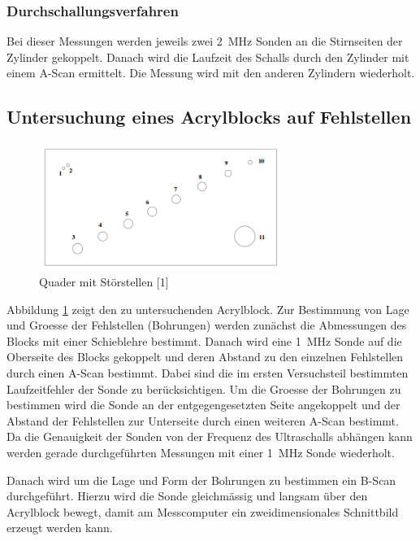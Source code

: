 \documentclass[11pt,ngerman,a4paper]{article}
\begin{document}
\subsubsection{Durchschallungsverfahren}
Bei dieser Messungen werden jeweils zwei \SI{2}{\mega\hertz} Sonden an die Stirnseiten der Zylinder gekoppelt. Danach wird die Laufzeit des Schalls durch den Zylinder mit einem A-Scan ermittelt. Die Messung wird mit den anderen Zylindern wiederholt.
\subsection{Untersuchung eines Acrylblocks auf Fehlstellen}
\begin{figure}[h]
\includegraphics[width=8cm]{quaderbild.png}
\caption{Quader mit Störstellen [1]}
\label{block}
\end{figure}
Abbildung \ref{block} zeigt den zu untersuchenden Acrylblock. Zur Bestimmung von Lage und Groesse der Fehlstellen (Bohrungen) werden zun\"achst die Abmessungen des Blocks mit einer Schieblehre bestimmt. Danach wird eine \SI{1}{\mega\hertz} Sonde auf die Oberseite des Blocks gekoppelt und deren Abstand zu den einzelnen Fehlstellen durch einen A-Scan bestimmt. Dabei sind die im ersten Versuchsteil bestimmten Laufzeitfehler der Sonde zu ber\"ucksichtigen. Um die Groesse der Bohrungen zu bestimmen wird die Sonde an der entgegengesetzten Seite angekoppelt und der Abstand der Fehlstellen zur Unterseite durch einen weiteren A-Scan bestimmt. Da die Genauigkeit der Sonden von der Frequenz des Ultraschalls abh\"angen kann werden gerade durchgef\"uhrten Messungen mit einer  \SI{1}{\mega\hertz} Sonde wiederholt. 

\noindent
Danach wird um die Lage und Form der Bohrungen zu bestimmen ein B-Scan durchgef\"uhrt. Hierzu wird die Sonde gleichm\"assig und langsam \"uber den Acrylblock bewegt, damit am Messcomputer ein zweidimensionales Schnittbild erzeugt werden kann.
\end{document}
